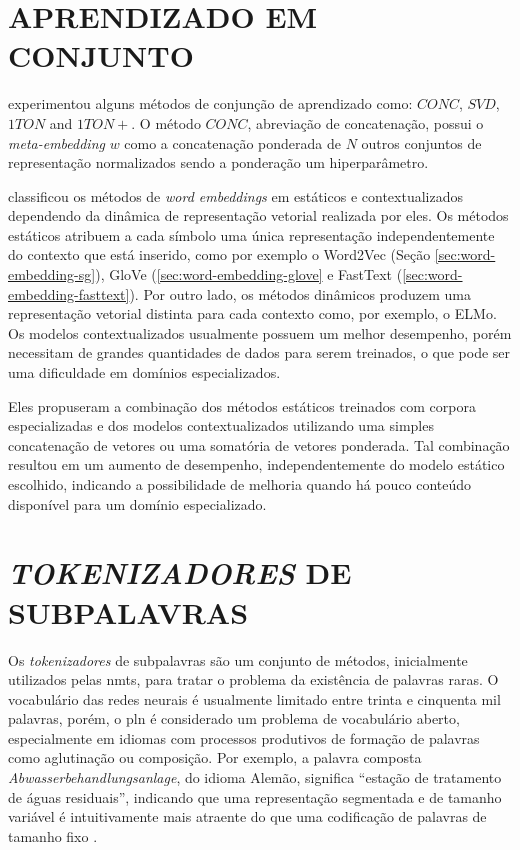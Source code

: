 \section{APRENDIZADO EM CONJUNTO}
\label{sec:pln-aprendizado-conjunto}

\textcite{Yin2015LearningWM} experimentou alguns métodos de conjunção de aprendizado como: $CONC$, $SVD$, $1TON$ and $1TON+$. O método $CONC$, abreviação de concatenação, possui o \textit{meta-embedding} $w$ como a concatenação ponderada de $N$ outros conjuntos de representação normalizados sendo a ponderação um hiperparâmetro.

\textcite{ElBoukkouriEtal2019Embedding} classificou os métodos de \textit{word embeddings} em estáticos e contextualizados dependendo da dinâmica de representação vetorial realizada por eles. Os métodos estáticos atribuem a cada símbolo uma única representação independentemente do contexto que está inserido, como por exemplo o Word2Vec (Seção \ref{sec:word-embedding-sg}), GloVe (\ref{sec:word-embedding-glove} e FastText (\ref{sec:word-embedding-fasttext}). Por outro lado, os métodos dinâmicos produzem uma representação vetorial distinta para cada contexto como, por exemplo, o ELMo. Os modelos contextualizados usualmente possuem um melhor desempenho, porém necessitam de grandes quantidades de dados para serem treinados, o que pode ser uma dificuldade em domínios especializados.

Eles propuseram a combinação dos métodos estáticos treinados com corpora especializadas e dos modelos contextualizados utilizando uma simples concatenação de vetores ou uma somatória de vetores ponderada. Tal combinação resultou em um aumento de desempenho, independentemente do modelo estático escolhido, indicando a possibilidade de melhoria quando há pouco conteúdo disponível para um domínio especializado.

\section{\textit{TOKENIZADORES} DE SUBPALAVRAS}
\label{sec:pln-tokenizer}

Os \textit{tokenizadores} de subpalavras são um conjunto de métodos, inicialmente utilizados pelas \glspl{nmt}, para tratar o problema da existência de palavras raras. O vocabulário das redes neurais é usualmente limitado entre trinta e cinquenta mil palavras, porém, o \gls{pln} é considerado um problema de vocabulário aberto, especialmente em idiomas com processos produtivos de formação de palavras como aglutinação ou composição. Por exemplo, a palavra composta \textit{Abwasserbehandlungsanlage}, do idioma Alemão, significa \enquote{estação de tratamento de águas residuais}, indicando que uma representação segmentada e de tamanho variável é intuitivamente mais atraente do que uma codificação de palavras de tamanho fixo \cite{Sennrich2016Neural}.

